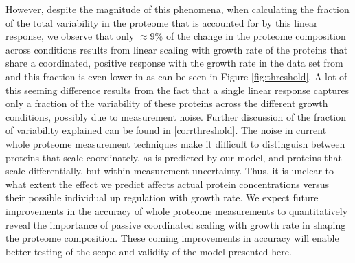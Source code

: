 However, despite the magnitude of this phenomena, when calculating the fraction of the total variability in the proteome that is accounted for by this linear response, we observe that only $\approx 9\%$ of the change in the proteome composition across conditions results from linear scaling with growth rate of the proteins that share a coordinated, positive response with the growth rate in the data set from \cite{Heinemann2015} and this fraction is even lower in \cite{Valgepea2013} as can be seen in Figure \ref{fig:threshold}.
A lot of this seeming difference results from the fact that a single linear response captures only a fraction of the variability of these proteins across the different growth conditions, possibly due to measurement noise.
Further discussion of the fraction of variability explained can be found in \ref{corrthreshold}.
The noise in current whole proteome measurement techniques make it difficult to distinguish between proteins that scale coordinately, as is predicted by our model, and proteins that scale differentially, but within measurement uncertainty.
Thus, it is unclear to what extent the effect we predict affects actual protein concentrations versus their possible individual up regulation with growth rate.
We expect future improvements in the accuracy of whole proteome measurements to quantitatively reveal the importance of passive coordinated scaling with growth rate in shaping the proteome composition. These coming improvements in accuracy will enable better testing of the scope and validity of the model presented here.